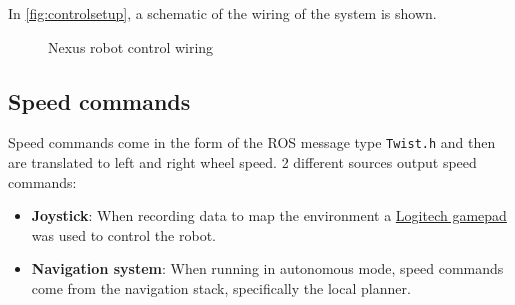 In \autoref{fig:controlsetup}, a schematic of the wiring of the system is shown.
\begin{figure}[htb]
  \centering
  \caption{Nexus robot control wiring}
  \label{fig:controlsetup}
\end{figure}  

\subsection{Speed commands}
Speed commands come in the form of the ROS message type \texttt{Twist.h} and then are translated to left and right wheel speed. 2 different sources output speed commands:
\begin{itemize}
  \item \textbf{Joystick}: When recording data to map the environment a \href{https://www.logitechg.com/en-us/products/gamepads/f710-wireless-gamepad.html}{Logitech gamepad} was used to control the robot.

  \item \textbf{Navigation system}: When running in autonomous mode, speed commands come from the navigation stack, specifically the local planner. 
\end{itemize}  

